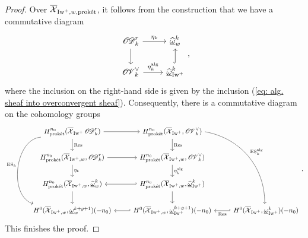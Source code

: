 \begin{proof}
Over $\overline{\operatorname{\mathcal{X}}}_{\operatorname{Iw}^+, w, \operatorname{\textrm{prok\'{e}t}}}$, it follows from the construction that we have a commutative diagram \[
    \begin{tikzcd}
        \sheafOD_{k}^r\arrow[r, "\eta_k"]\arrow[d] & \widehat{\underline{\omega}}_w^{k}\\
        \sheafOV_k^{\vee}\arrow[r, "\eta_k^{\alg}"] & \widehat{\underline{\omega}}_{\Iw^+}^{k}\arrow[u, hook]
    \end{tikzcd},
\] where the inclusion on the right-hand side is given by the inclusion (\ref{eq: alg. sheaf into overconvergent sheaf}). Consequently, there is a commutative diagram on the cohomology groups \[
    \begin{tikzcd}
        H_{\proket}^{n_0}(\overline{\calX}_{\Iw^+}\sheafOD_{k}^r)\arrow[r]\arrow[d, "\mathrm{Res}"] \arrow[ddd, bend right = 80, "\ES_{k}"'] & H_{\proket}^{n_0}(\overline{\calX}_{\Iw^+}, \sheafOV_{k}^{\vee})\arrow[d, "\mathrm{Res}"] \arrow[dddr, bend left = 40, "\ES_k^{\alg}"]\\
        H_{\proket}^{n_0}(\overline{\calX}_{\Iw^+, w}, \sheafOD_{k}^r)\arrow[r]\arrow[d, "\eta_k"] & H_{\proket}^{n_0}(\overline{\calX}_{\Iw^+, w}, \sheafOV_k^{\vee})\arrow[d, "\eta_{k}^{\alg}"]\\
        H_{\proket}^{n_0}(\overline{\calX}_{\Iw^+, w}, \widehat{\underline{\omega}}_{w}^{k})\arrow[d] & H_{\proket}^{n_0}(\overline{\calX}_{\Iw^+, w}, \widehat{\underline{\omega}}_{\Iw^+}^{k})\arrow[d]\arrow[l, hook']\\
        H^0(\overline{\calX}_{\Iw^+, w}, \underline{\omega}_{w}^{k+g+1})(-n_0) & H^0(\overline{\calX}_{\Iw^+, w}, \underline{\omega}_{\Iw^+}^{k+g+1})(-n_0)\arrow[l, hook'] & H^0(\overline{\calX}_{\Iw^+}, \underline{\omega}_{\Iw^+}^{k})(-n_0)\arrow[l, hook', "\mathrm{Res}"]
    \end{tikzcd}.
\] This finishes the proof.
\end{proof}